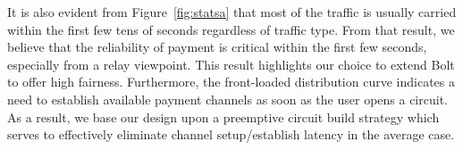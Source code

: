 It is also evident from Figure~\ref{fig:statsa} that most of the traffic is
usually carried within the first few tens of seconds regardless of traffic type.
From that result, we believe that the reliability of payment is critical within
the first few seconds, especially from a relay viewpoint. This result highlights
our choice to extend Bolt to offer high fairness. Furthermore, the front-loaded
distribution curve indicates a need to establish available payment channels as
soon as the user opens a circuit. As a result, we base our design upon a
preemptive circuit build strategy which serves to effectively eliminate channel
setup/establish latency in the average case.


